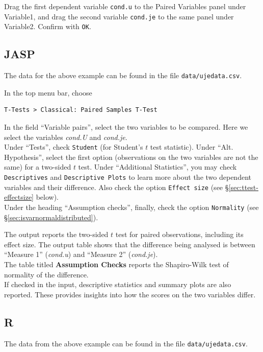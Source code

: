\documentclass[
]{book}
\begin{document}
Drag the first dependent variable \texttt{cond.u} to the Paired
Variables panel under Variable1, and drag the second variable \texttt{cond.je} to
the same panel under Variable2. Confirm with \texttt{OK}.

\subsection{JASP}\label{sec:JASP-ttest-paired}

The data for the above example can be found in the file \texttt{data/ujedata.csv}.

In the top menu bar, choose

\begin{verbatim}
T-Tests > Classical: Paired Samples T-Test
\end{verbatim}

In the field ``Variable pairs'', select the two variables to be compared. Here we select the variables \emph{cond.U} and \emph{cond.je}.\\
Under ``Tests'', check \texttt{Student} (for Student's \(t\) test statistic). Under ``Alt. Hypothesis'', select the first option (observations on the two variables are not the same) for a two-sided \(t\) test.
Under ``Additional Statistics'', you may check \texttt{Descriptives} and \texttt{Descriptive\ Plots} to learn more about the two dependent variables and their difference. Also check the option \texttt{Effect\ size} (see §\ref{sec:ttest-effectsize} below).\\
Under the heading ``Assumption checks'', finally, check the option \texttt{Normality} (see §\ref{sec:isvarnormaldistributed}).

The output reports the two-sided \(t\) test for paired observations, including its effect size. The output table shows that the difference being analysed is between ``Measure 1'' (\emph{cond.u}) and ``Measure 2'' (\emph{cond.je}).\\
The table titled \textbf{Assumption Checks} reports the Shapiro-Wilk test of normality of the difference.\\
If checked in the input, descriptive statistics and summary plots are also reported. These provides insights into how the scores on the two variables differ.

\subsection{R}\label{sec:R-ttest-paired}

The data from the above example can be found in the file \texttt{data/ujedata.csv}.
\end{document}
